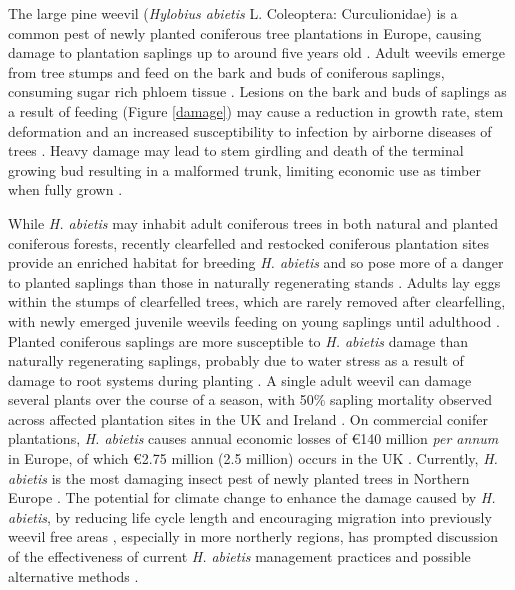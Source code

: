 \documentclass[a4paper, 11pt]{article}
\newcommand{\textapprox}{\raisebox{0.5ex}{\texttildelow}}
\begin{document}
The large pine weevil (\textit{Hylobius abietis} L. Coleoptera: Curculionidae) is a common pest of newly planted coniferous tree plantations in Europe, causing damage to plantation saplings up to around five years old \citep{Ordlander1997}. Adult weevils emerge from tree stumps and feed on the bark and buds of coniferous saplings, consuming sugar rich phloem tissue \citep{Nordlander1991}. Lesions on the bark and buds of saplings as a result of feeding (Figure \ref{damage}) may cause a reduction in growth rate, stem deformation and an increased susceptibility to infection by airborne diseases of trees \citep{Leather1999}. Heavy damage may lead to stem girdling and death of the terminal growing bud resulting in a malformed trunk, limiting economic use as timber when fully grown \citep{Alfaro1989, Gill1992}. 

While \textit{H. abietis} may inhabit adult coniferous trees in both natural and planted coniferous forests, recently clearfelled and restocked coniferous plantation sites provide an enriched habitat for breeding \textit{H. abietis} and so pose more of a danger to planted saplings than those in naturally regenerating stands \citep{Willoughby2004, Orlander1999}. Adults lay eggs within the stumps of clearfelled trees, which are rarely removed after clearfelling, with newly emerged juvenile weevils feeding on young saplings until adulthood \citep{Willoughby2004}. Planted coniferous saplings are more susceptible to \textit{H. abietis} damage than naturally regenerating saplings, probably due to water stress as a result of damage to root systems during planting \citep{Selander1990}. A single adult weevil can damage several plants over the course of a season, with \textapprox{}50\% sapling mortality observed across affected plantation sites in the UK and Ireland \citep{Heritage2001}. On commercial conifer plantations, \textit{H. abietis} causes annual economic losses of \euro{}140 million \textit{per annum} in Europe, of which \euro{}2.75 million (\textapprox{}\textsterling{}2.5 million) occurs in the UK \citep{Evans2015}. Currently, \textit{H. abietis} is the most damaging insect pest of newly planted trees in Northern Europe \citep{Evans2015}. The potential for climate change to enhance the damage caused by \textit{H. abietis}, by reducing life cycle length \citep{Leather1999} and encouraging migration into previously weevil free areas \citep{Inward2012, Barredo2015}, especially in more northerly regions, has prompted discussion of the effectiveness of current \textit{H. abietis} management practices and possible alternative methods \citep{Kapranas2017, McNamara2018}.
\end{document}
